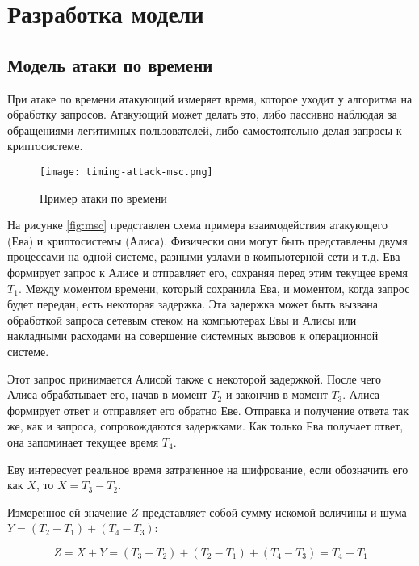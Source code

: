 \section{Разработка модели} \label{sec:timing}

\subsection{Модель атаки по времени}

При атаке по времени атакующий измеряет время, которое уходит у алгоритма на
обработку запросов. Атакующий может делать это, либо пассивно наблюдая за
обращениями легитимных пользователей, либо самостоятельно делая запросы к
криптосистеме.

\begin{figure}[h]
    \centering
    \texttt{[image: timing-attack-msc.png]}
    \caption{Пример атаки по времени}
\end{figure} \label{fig:msc}

На рисунке \ref{fig:msc} представлен схема примера взаимодействия
атакующего (Ева) и криптосистемы (Алиса). Физически они могут быть представлены
двумя процессами на одной системе, разными узлами в компьютерной сети и т.д.
Ева формирует запрос к Алисе и отправляет его, сохраняя перед этим текущее
время $T_1$. Между моментом времени, который сохранила Ева, и моментом, когда
запрос будет передан, есть некоторая задержка. Эта задержка может быть вызвана
обработкой запроса сетевым стеком на компьютерах Евы и Алисы или накладными
расходами на совершение системных вызовов к операционной системе.

Этот запрос принимается Алисой также с некоторой задержкой. После чего Алиса
обрабатывает его, начав в момент $T_2$ и закончив в момент $T_3$. Алиса
формирует ответ и отправляет его обратно Еве. Отправка и получение ответа так
же, как и запроса, сопровождаются задержками. Как только Ева получает ответ, она
запоминает текущее время $T_4$.

Еву интересует реальное время затраченное на шифрование, если обозначить его как
$X$, то $X = T_3 - T_2$.

Измеренное ей значение $Z$ представляет собой сумму искомой величины и шума
$Y = (T_2 - T_1) + (T_4 - T_3)$:

\begin{equation}
Z = X + Y = (T_3 - T_2) + (T_2 - T_1) + (T_4 - T_3) = T_4 - T_1
\end{equation} \label{eq:noise}

